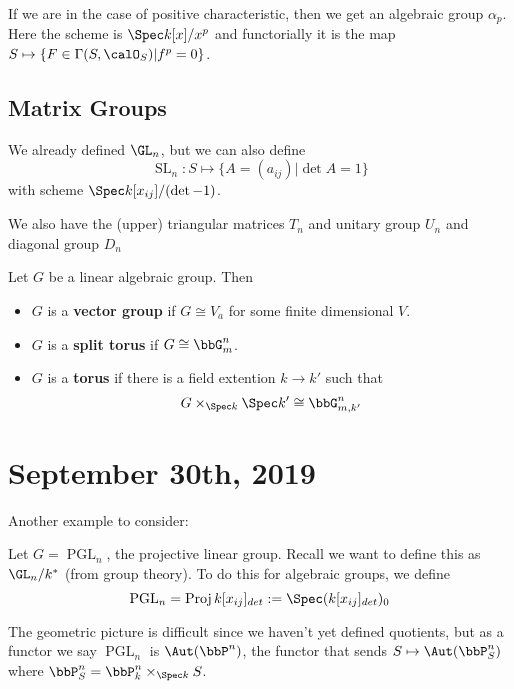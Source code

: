 \documentclass[12pt]{article}
\begin{document}
\begin{ex}
	If we are in the case of positive characteristic, then we get an algebraic group $\alpha_p$. Here the scheme is $\Spec k[x]/x^p$ and functorially it 
	is the map $S\mapsto \{F\in\Gamma(S,\calO_S)|f^p=0\}$.
\end{ex}

\subsection{Matrix Groups}
We already defined $\GL_n$, but we can also define 
\[\operatorname{SL}_n:S\mapsto\{A=(a_{ij})|\det A=1\}\]
with scheme $\Spec k[x_{ij}]/(\det-1)$.

We also have the (upper) triangular matrices $T_n$ and unitary group $U_n$ and diagonal group $D_n$

\begin{defn}
	Let $G$ be a linear algebraic group. Then 
	\begin{itemize}
		\item $G$ is a \textbf{vector group} if $G\cong V_a$ for some finite dimensional $V$.
		\item $G$ is a \textbf{split torus} if $G\cong \bbG_m^n$.
		\item $G$ is a \textbf{torus} if there is a field extention $k\to k'$ such that 
		\[G\times_{\Spec k}\Spec k'\cong \bbG^n_{m,k'}\]
	\end{itemize}
\end{defn}

\section{September 30th, 2019}
Another example to consider:
\begin{ex}
	Let $G=\operatorname{PGL}_n$, the projective linear group. Recall we want to define this as $\GL_n/k^\ast$ (from group theory). To do this for algebraic groups,
	we define 
	\[\operatorname{PGL}_n=\operatorname{Proj}k[x_{ij}]_{det}:= \Spec (k[x_{ij}]_{det})_0\]

	The geometric picture is difficult since we haven't yet defined quotients, but as a functor we say $\operatorname{PGL}_n$ 
	is $\Aut(\bbP^n)$, the functor that sends $S\mapsto \Aut(\bbP_S^n)$ where $\bbP^n_S=\bbP_k^n\times_{\Spec k} S$.
\end{ex}
\end{document}
